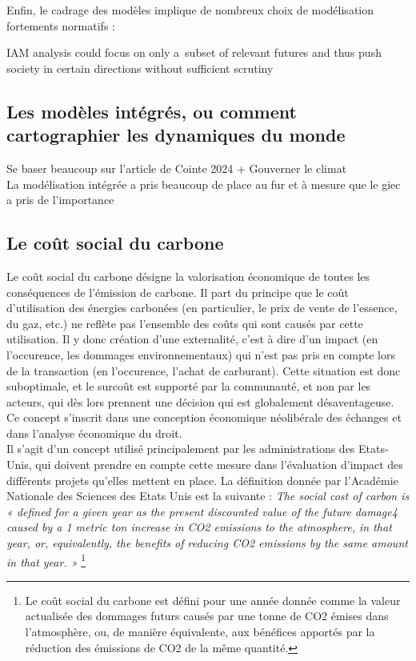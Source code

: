 Enfin, le cadrage des modèles implique de nombreux choix de modélisation fortements normatifs : 

\begin{displayquote}
    IAM analysis could focus on only a subset of relevant futures and thus push society in certain directions without sufficient scrutiny
\end{displayquote}

\subsection{Les modèles intégrés, ou comment cartographier les dynamiques du monde}
\label{sect:1.3.1}

Se baser beaucoup sur l'article de Cointe 2024 + Gouverner le climat \\

La modélisation intégrée a pris beaucoup de place au fur et à mesure que le giec a pris de l'importance

\subsection{Le coût social du carbone}
\label{sect:1.3.2}

Le coût social du carbone désigne la valorisation économique de toutes les conséquences de l'émission de carbone. Il part du principe que le coût d'utilisation des énergies carbonées (en particulier, le prix de vente de l'essence, du gaz, etc.) ne reflète pas l'ensemble des coûts qui sont causés par cette utilisation. Il y donc création d'une externalité, c'est à dire d'un impact (en l'occurence, les dommages environnementaux) qui n'est pas pris en compte lors de la transaction (en l'occurence, l'achat de carburant). Cette situation est donc suboptimale, et le surcoût est supporté par la communauté, et non par les acteurs, qui dès lors prennent une décision qui est globalement désaventageuse. Ce concept s'inscrit dans une conception économique néolibérale des échanges et dans l'analyse économique du droit.  \\

Il s'agit d'un concept utilisé principalement par les administrations des Etats-Unis, qui doivent prendre en compte cette mesure dans l'évaluation d'impact des différents projets qu'elles mettent en place. La définition donnée par l'Académie Nationale des Sciences des Etats Unis est la suivante : \emph{The social cost of carbon is « defined for a given year as the present discounted value of the future damage4 caused by a 1 metric ton increase in CO2 emissions to the atmosphere, in that year, or, equivalently, the benefits of reducing CO2 emissions by the same amount in that year. » }\footnote{Le coût social du carbone est défini pour une année donnée comme la valeur actualisée des dommages futurs causés par une tonne de CO2 émises dans l'atmosphère, ou, de manière équivalente, aux bénéfices apportés par la réduction des émissions de CO2 de la même quantité.} \\

